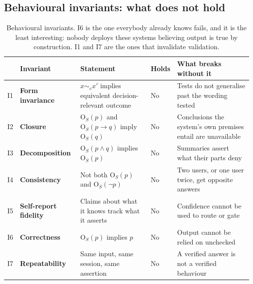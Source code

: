 \documentclass[11pt]{article}
\newcommand{\Out}{\mathrm{O}}          %
\theoremstyle{plain}
\theoremstyle{definition}
\begin{document}
\subsection{Behavioural invariants: what does not hold}

\begin{table}[ht]
  \centering
  \small
  \begin{tabular}{@{}>{\raggedright\arraybackslash}p{0.5cm}>{\raggedright\arraybackslash}p{2.9cm}>{\raggedright\arraybackslash}p{4.1cm}>{\raggedright\arraybackslash}p{1.1cm}>{\raggedright\arraybackslash}p{4.4cm}@{}}
    \toprule
    & Invariant & Statement & Holds & What breaks without it \\
    \midrule
    I1 & \textbf{Form invariance}
       & $x \sim_c x'$ implies equivalent decision-relevant outcome
       & No
       & Tests do not generalise past the wording tested \\
    \addlinespace
    I2 & \textbf{Closure}
       & $\Out_S(p)$ and $\Out_S(p \rightarrow q)$ imply $\Out_S(q)$
       & No
       & Conclusions the system's own premises entail are unavailable \\
    \addlinespace
    I3 & \textbf{Decomposition}
       & $\Out_S(p \wedge q)$ implies $\Out_S(p)$
       & No
       & Summaries assert what their parts deny \\
    \addlinespace
    I4 & \textbf{Consistency}
       & Not both $\Out_S(p)$ and $\Out_S(\neg p)$
       & No
       & Two users, or one user twice, get opposite answers \\
    \addlinespace
    I5 & \textbf{Self-report fidelity}
       & Claims about what it knows track what it asserts
       & No
       & Confidence cannot be used to route or gate \\
    \addlinespace
    I6 & \textbf{Correctness}
       & $\Out_S(p)$ implies $p$
       & No
       & Output cannot be relied on unchecked \\
    \addlinespace
    I7 & \textbf{Repeatability}
       & Same input, same session, same assertion
       & No
       & A verified answer is not a verified behaviour \\
    \bottomrule
  \end{tabular}
  \caption{Behavioural invariants. I6 is the one everybody already knows fails, and
    it is the least interesting: nobody deploys these systems believing output is
    true by construction. I1 and I7 are the ones that invalidate validation.}
  \label{tab:invariants-behaviour}
\end{table}
\end{document}
